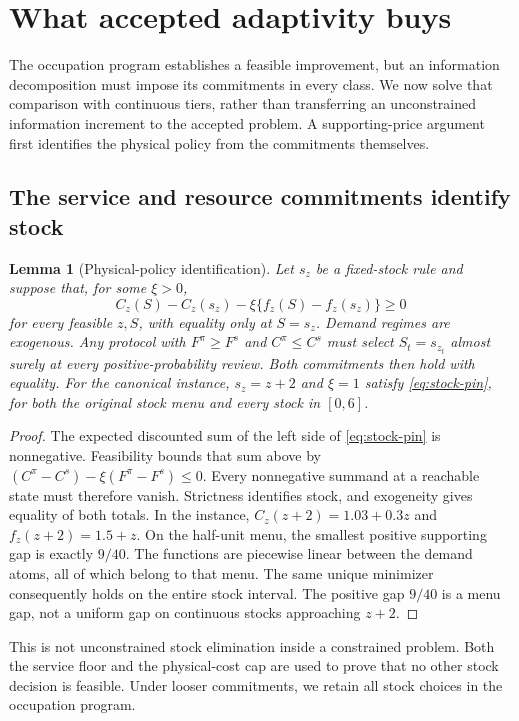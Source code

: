 \documentclass[11pt,letterpaper]{article}
\newtheorem{lemma}[theorem]{Lemma}
\theoremstyle{definition}
\newcommand{\1}{\mathbf 1}
\begin{document}


\section{What accepted adaptivity buys}\label{sec:accepted-continuous}
The occupation program establishes a feasible improvement, but an information decomposition must impose its commitments in every class. We now solve that comparison with continuous tiers, rather than transferring an unconstrained information increment to the accepted problem. A supporting-price argument first identifies the physical policy from the commitments themselves.

\subsection{The service and resource commitments identify stock}
\begin{lemma}[Physical-policy identification]\label{lem:stock-pin}
Let $s_z$ be a fixed-stock rule and suppose that, for some $\xi>0$,
\begin{equation}\label{eq:stock-pin}
 C_z(S)-C_z(s_z)-\xi\{f_z(S)-f_z(s_z)\}\geq0
\end{equation}
for every feasible $z,S$, with equality only at $S=s_z$. Demand regimes are exogenous. Any protocol with $F^\pi\geq F^s$ and $C^\pi\leq C^s$ must select $S_t=s_{z_t}$ almost surely at every positive-probability review. Both commitments then hold with equality. For the canonical instance, $s_z=z+2$ and $\xi=1$ satisfy \eqref{eq:stock-pin}, for both the original stock menu and every stock in $[0,6]$.
\end{lemma}
\begin{proof}
The expected discounted sum of the left side of \eqref{eq:stock-pin} is nonnegative. Feasibility bounds that sum above by $(C^\pi-C^s)-\xi(F^\pi-F^s)\leq0$. Every nonnegative summand at a reachable state must therefore vanish. Strictness identifies stock, and exogeneity gives equality of both totals. In the instance, $C_z(z+2)=1.03+0.3z$ and $f_z(z+2)=1.5+z$. On the half-unit menu, the smallest positive supporting gap is exactly $9/40$. The functions are piecewise linear between the demand atoms, all of which belong to that menu. The same unique minimizer consequently holds on the entire stock interval. The positive gap $9/40$ is a menu gap, not a uniform gap on continuous stocks approaching $z+2$.
\end{proof}
This is not unconstrained stock elimination inside a constrained problem. Both the service floor and the physical-cost cap are used to prove that no other stock decision is feasible. Under looser commitments, we retain all stock choices in the occupation program.
\end{document}
